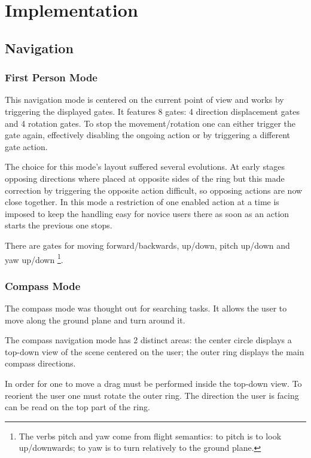 \chapter{Implementation}



\section{Navigation}

\subsection{First Person Mode}

This navigation mode is centered on the current point of view and works by triggering the displayed gates.
It features 8 gates: 4 direction displacement gates and 4 rotation gates.
To stop the movement/rotation one can either trigger the gate again, effectively disabling the ongoing action
or by triggering a different gate action.

The choice for this mode's layout suffered several evolutions.
At early stages opposing directions where placed at opposite sides of the ring but this
made correction by triggering the opposite action difficult, so opposing actions are now close together.
In this mode a restriction of one enabled action at a time is imposed to keep the handling easy for novice users
there as soon as an action starts the previous one stops.

There are gates for moving forward/backwards, up/down, pitch up/down and yaw up/down
\footnote{The verbs pitch and yaw come from flight semantics: to pitch is to look up/downwards; to yaw is to turn relatively to the ground plane.}.



\subsection{Compass Mode}

The compass mode was thought out for searching tasks. It allows the user to move along the ground plane and turn around it.

The compass navigation mode has 2 distinct areas:
the center circle displays a top-down view of the scene centered on the user;
the outer ring displays the main compass directions.

In order for one to move a drag must be performed inside the top-down view.
To reorient the user one must rotate the outer ring. The direction the user is facing can be read on the top part of the ring.

